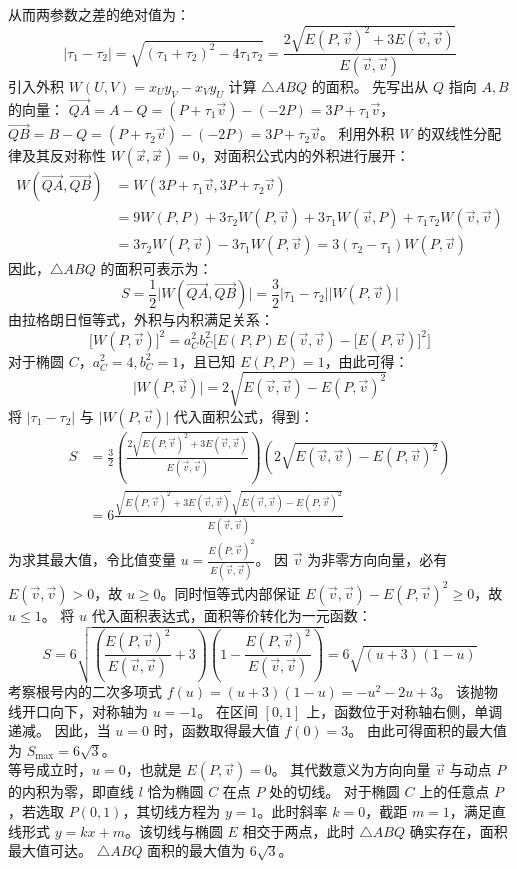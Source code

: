 \begin{solution}
从而两参数之差的绝对值为：
$$ |\tau_1 - \tau_2| = \sqrt{(\tau_1 + \tau_2)^2 - 4\tau_1 \tau_2} = \frac{2\sqrt{E(P, \vec{v})^2 + 3E(\vec{v}, \vec{v})}}{E(\vec{v}, \vec{v})} $$
引入外积 $W(U, V) = x_U y_V - x_V y_U$ 计算 $\triangle ABQ$ 的面积。
先写出从 $Q$ 指向 $A, B$ 的向量：
$\overrightarrow{QA} = A - Q = (P + \tau_1 \vec{v}) - (-2P) = 3P + \tau_1 \vec{v}$，
$\overrightarrow{QB} = B - Q = (P + \tau_2 \vec{v}) - (-2P) = 3P + \tau_2 \vec{v}$。
利用外积 $W$ 的双线性分配律及其反对称性 $W(\vec{x}, \vec{x}) = 0$，对面积公式内的外积进行展开：
\begin{align*}
W(\overrightarrow{QA}, \overrightarrow{QB}) &= W(3P + \tau_1 \vec{v}, 3P + \tau_2 \vec{v}) \\
&= 9W(P, P) + 3\tau_2 W(P, \vec{v}) + 3\tau_1 W(\vec{v}, P) + \tau_1 \tau_2 W(\vec{v}, \vec{v}) \\
&= 3\tau_2 W(P, \vec{v}) - 3\tau_1 W(P, \vec{v}) = 3(\tau_2 - \tau_1) W(P, \vec{v})
\end{align*}
因此，$\triangle ABQ$ 的面积可表示为：
$$ S = \frac{1}{2} \big| W(\overrightarrow{QA}, \overrightarrow{QB}) \big| = \frac{3}{2} |\tau_1 - \tau_2| \big| W(P, \vec{v}) \big| $$
由拉格朗日恒等式，外积与内积满足关系：
$$ \big[W(P, \vec{v})\big]^2 = a_C^2 b_C^2 \Big[ E(P, P)E(\vec{v}, \vec{v}) - \big[E(P, \vec{v})\big]^2 \Big] $$
对于椭圆 $C$，$a_C^2 = 4, b_C^2 = 1$，且已知 $E(P, P) = 1$，由此可得：
$$ \big|W(P, \vec{v})\big| = 2\sqrt{E(\vec{v}, \vec{v}) - E(P, \vec{v})^2} $$
将 $|\tau_1 - \tau_2|$ 与 $\big|W(P, \vec{v})\big|$ 代入面积公式，得到：
\[
\begin{aligned}
S
&= \frac{3}{2} \left( \frac{2\sqrt{E(P, \vec{v})^2 + 3E(\vec{v}, \vec{v})}}{E(\vec{v}, \vec{v})} \right)
\left( 2\sqrt{E(\vec{v}, \vec{v}) - E(P, \vec{v})^2} \right) \\
&= 6 \frac{\sqrt{E(P, \vec{v})^2 + 3E(\vec{v}, \vec{v})} \sqrt{E(\vec{v}, \vec{v}) - E(P, \vec{v})^2}}{E(\vec{v}, \vec{v})}
\end{aligned}
\]
为求其最大值，令比值变量 $u = \frac{E(P, \vec{v})^2}{E(\vec{v}, \vec{v})}$。
因 $\vec{v}$ 为非零方向向量，必有 $E(\vec{v}, \vec{v}) > 0$，故 $u \ge 0$。同时恒等式内部保证 $E(\vec{v}, \vec{v}) - E(P, \vec{v})^2 \ge 0$，故 $u \le 1$。
将 $u$ 代入面积表达式，面积等价转化为一元函数：
$$ S = 6 \sqrt{\left(\frac{E(P, \vec{v})^2}{E(\vec{v}, \vec{v})} + 3\right)\left(1 - \frac{E(P, \vec{v})^2}{E(\vec{v}, \vec{v})}\right)} = 6 \sqrt{\left(u + 3\right)\left(1 - u\right)} $$
考察根号内的二次多项式 $f(u) = (u + 3)(1 - u) = -u^2 - 2u + 3$。
该抛物线开口向下，对称轴为 $u = -1$。
在区间 $[0, 1]$ 上，函数位于对称轴右侧，单调递减。
因此，当 $u = 0$ 时，函数取得最大值 $f(0) = 3$。
由此可得面积的最大值为 $S_{\max} = 6\sqrt{3}$。\\
等号成立时，$u = 0$，也就是 $E(P, \vec{v}) = 0$。
其代数意义为方向向量 $\vec{v}$ 与动点 $P$ 的内积为零，即直线 $l$ 恰为椭圆 $C$ 在点 $P$ 处的切线。
对于椭圆 $C$ 上的任意点 $P$，若选取 $P(0, 1)$，其切线方程为 $y = 1$。此时斜率 $k = 0$，截距 $m = 1$，满足直线形式 $y = kx + m$。该切线与椭圆 $E$ 相交于两点，此时 $\triangle ABQ$ 确实存在，面积最大值可达。
$\triangle ABQ$ 面积的最大值为 $6\sqrt{3}$。
\end{solution}



